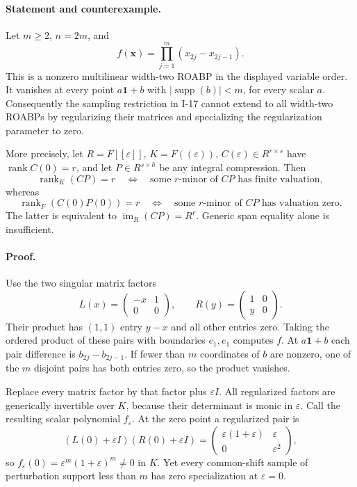 \paragraph{Statement and counterexample.}
Let $m\ge2$, $n=2m$, and
\[
 f(\mathbf x)=\prod_{j=1}^m(x_{2j}-x_{2j-1}).
\]
This is a nonzero multilinear width-two ROABP in the displayed
variable order.  It vanishes at every point $a\mathbf1+b$ with
$|\operatorname{supp}(b)|<m$, for every scalar $a$.
Consequently the sampling restriction in I-17 cannot extend to
all width-two ROABPs by regularizing their matrices and specializing
the regularization parameter to zero.

More precisely, let $R=F[[\varepsilon]]$, $K=F((\varepsilon))$,
$C(\varepsilon)\in R^{r\times s}$ have
$\operatorname{rank}C(0)=r$, and let $P\in R^{s\times h}$ be any
integral compression.  Then
\[
 \operatorname{rank}_K(CP)=r
 \quad\Longleftrightarrow\quad
 \text{some $r$-minor of $CP$ has finite valuation},
\]
whereas
\[
 \operatorname{rank}_F(C(0)P(0))=r
 \quad\Longleftrightarrow\quad
 \text{some $r$-minor of $CP$ has valuation zero}.
\tag{I.18}\label{eq:I-unit-Plucker}
\]
The latter is equivalent to $\operatorname{im}_R(CP)=R^r$.
Generic span equality alone is insufficient.

\paragraph{Proof.}
Use the two singular matrix factors
\[
 L(x)=\begin{pmatrix}-x&1\\0&0\end{pmatrix},\qquad
 R(y)=\begin{pmatrix}1&0\\y&0\end{pmatrix}.
\]
Their product has $(1,1)$ entry $y-x$ and all other entries zero.
Taking the ordered product of these pairs with boundaries $e_1,e_1$
computes $f$.  At $a\mathbf1+b$ each pair difference is
$b_{2j}-b_{2j-1}$.  If fewer than $m$ coordinates of $b$ are
nonzero, one of the $m$ disjoint pairs has both entries zero,
so the product vanishes.

Replace every matrix factor by that factor plus $\varepsilon I$.
All regularized factors are generically invertible over $K$,
because their determinant is monic in $\varepsilon$.
Call the resulting scalar polynomial $f_\varepsilon$.
At the zero point a regularized pair is
\[
 (L(0)+\varepsilon I)(R(0)+\varepsilon I)
  =\begin{pmatrix}\varepsilon(1+\varepsilon)&\varepsilon\\
                   0&\varepsilon^2\end{pmatrix},
\]
so $f_\varepsilon(0)=\varepsilon^m(1+\varepsilon)^m\ne0$ in $K$.
Yet every common-shift sample of perturbation support less than $m$
has zero specialization at $\varepsilon=0$.

